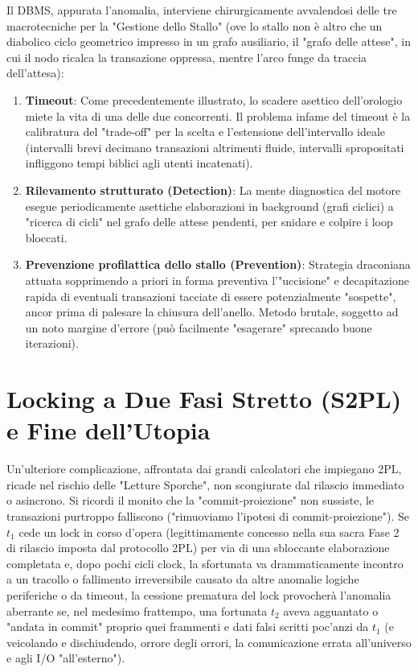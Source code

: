Il DBMS, appurata l'anomalia, interviene chirurgicamente avvalendosi delle tre macrotecniche per la "Gestione dello Stallo" (ove lo stallo non è altro che un diabolico ciclo geometrico impresso in un grafo ausiliario, il "grafo delle attese", in cui il nodo ricalca la transazione oppressa, mentre l'arco funge da traccia dell'attesa):
\begin{enumerate}
    \item \textbf{Timeout}: Come precedentemente illustrato, lo scadere asettico dell'orologio miete la vita di una delle due concorrenti. Il problema infame del timeout è la calibratura del "trade-off" per la scelta e l'estensione dell'intervallo ideale (intervalli brevi decimano transazioni altrimenti fluide, intervalli spropositati infliggono tempi biblici agli utenti incatenati).
    \item \textbf{Rilevamento strutturato (Detection)}: La mente diagnostica del motore esegue periodicamente asettiche elaborazioni in background (grafi ciclici) a "ricerca di cicli" nel grafo delle attese pendenti, per snidare e colpire i loop bloccati.
    \item \textbf{Prevenzione profilattica dello stallo (Prevention)}: Strategia draconiana attuata sopprimendo a priori in forma preventiva l'"uccisione" e decapitazione rapida di eventuali transazioni tacciate di essere potenzialmente "sospette", ancor prima di palesare la chiusura dell'anello. Metodo brutale, soggetto ad un noto margine d'errore (può facilmente "esagerare" sprecando buone iterazioni).
\end{enumerate}

\section{Locking a Due Fasi Stretto (S2PL) e Fine dell'Utopia}

Un'ulteriore complicazione, affrontata dai grandi calcolatori che impiegano 2PL, ricade nel rischio delle "Letture Sporche", non scongiurate dal rilascio immediato o asincrono. Si ricordi il monito che la "commit-proiezione" non sussiste, le transazioni purtroppo falliscono ("rimuoviamo l'ipotesi di commit-proiezione").
Se $t_1$ cede un lock in corso d'opera (legittimamente concesso nella sua sacra Fase 2 di rilascio imposta dal protocollo 2PL) per via di una sbloccante elaborazione completata e, dopo pochi cicli clock, la sfortunata va drammaticamente incontro a un tracollo o fallimento irreversibile causato da altre anomalie logiche periferiche o da timeout, la cessione prematura del lock provocherà l'anomalia aberrante se, nel medesimo frattempo, una fortunata $t_2$ aveva agguantato o "andata in commit" proprio quei frammenti e dati falsi scritti poc'anzi da $t_1$ (e veicolando e dischiudendo, orrore degli orrori, la comunicazione errata all'universo e agli I/O "all'esterno").

